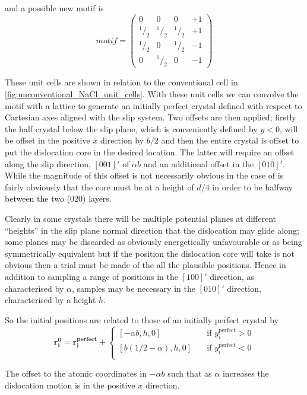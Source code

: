 and a possible new motif is 
$$
motif = \begin{pmatrix}
0 & 0 & 0 & +1 \\
^{1}\!/_{2} & ^{1}\!/_{2} & ^{1}\!/_{2} & +1 \\
^{1}\!/_{2} & 0 & ^{1}\!/_{2} & -1 \\
0 & ^{1}\!/_{2} & 0 & -1
\end{pmatrix}
$$


These unit cells are shown in relation to the conventional cell in \autoref{fig:unconventional_NaCl_unit_cells}. With these unit cells we can convolve the motif with a lattice to generate an initially perfect crystal defined with respect to Cartesian axes aligned with the slip system. Two offsets are then applied; firstly the half crystal below the slip plane, which is conveniently defined by $y < 0$, will be offset in the positive $x$ direction by $b/2$ and then the entire crystal is offset to put the dislocation core in the desired location. The latter will require an offset along the slip direction, $[001]'$ of $\alpha b$ and an additional offset in the $[010]'$. While the magnitude of this offset is not necessarily obvious in the case of  is fairly obviously that the core must be at a height of $d/4$ in order to be halfway between the two (020) layers.


Clearly in some crystals there will be multiple potential planes at different ``heights'' in the slip plane normal direction that the dislocation may glide along; some planes may be discarded as obviously energetically unfavourable or as being symmetrically equivalent but if the position the dislocation core will take is not obvious then a trial must be made of the all the plausible positions. Hence in addition to sampling a range of positions in the $[100]'$ direction, as characterised by $\alpha$, samples may be necessary in the $[010]'$ direction, characterised by a height $h$.

So the initial positions are related to those of an initially perfect crystal by
\begin{equation}
\bm{r_i^0} = \bm{r_i^{\text{perfect}}} +\begin{cases}
[-\alpha{}b, h, 0] & \quad \text{if } y_i^{\text{perfect}} > 0\\
[b(1/2 - \alpha{}), h, 0] & \quad \text{if } y_i^{\text{perfect}} < 0\\
\end{cases} 
\end{equation}

The offset to the atomic coordinates in $-\alpha{}b$ such that as $\alpha$ increases the dislocation motion is in the positive $x$ direction.





